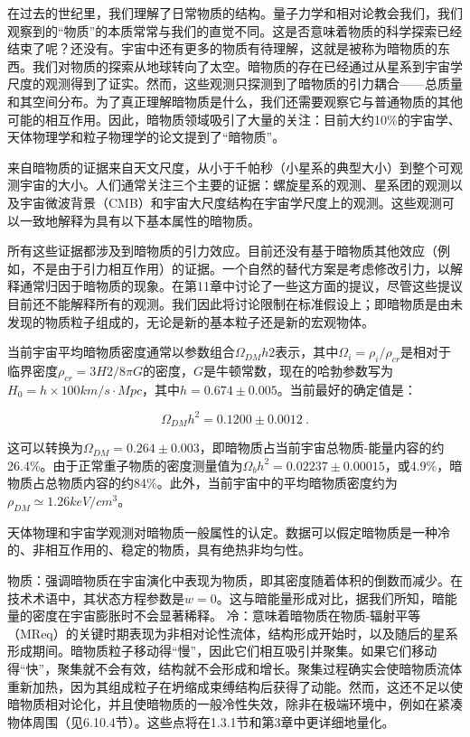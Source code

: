 
在过去的世纪里，我们理解了日常物质的结构。量子力学和相对论教会我们，我们观察到的“物质”的本质常常与我们的直觉不同。这是否意味着物质的科学探索已经结束了呢？还没有。宇宙中还有更多的物质有待理解，这就是被称为暗物质的东西。我们对物质的探索从地球转向了太空。暗物质的存在已经通过从星系到宇宙学尺度的观测得到了证实。然而，这些观测只探测到了暗物质的引力耦合——总质量和其空间分布。为了真正理解暗物质是什么，我们还需要观察它与普通物质的其他可能的相互作用。因此，暗物质领域吸引了大量的关注：目前大约10\%的宇宙学、天体物理学和粒子物理学的论文提到了“暗物质”。

来自暗物质的证据来自天文尺度，从小于千帕秒（小星系的典型大小）到整个可观测宇宙的大小。人们通常关注三个主要的证据：螺旋星系的观测、星系团的观测以及宇宙微波背景（CMB）和宇宙大尺度结构在宇宙学尺度上的观测。这些观测可以一致地解释为具有以下基本属性的暗物质。

所有这些证据都涉及到暗物质的引力效应。目前还没有基于暗物质其他效应（例如，不是由于引力相互作用）的证据。一个自然的替代方案是考虑修改引力，以解释通常归因于暗物质的现象。在第11章中讨论了一些这方面的提议，尽管这些提议目前还不能解释所有的观测。我们因此将讨论限制在标准假设上；即暗物质是由未发现的物质粒子组成的，无论是新的基本粒子还是新的宏观物体。

当前宇宙平均暗物质密度通常以参数组合$\Omega_{DM}h2$表示，其中$\Omega_i = \rho_i/\rho_{cr}$是相对于临界密度$\rho_{cr} = 3H2/8\pi G$的密度，$G$是牛顿常数，现在的哈勃参数写为$H_0 = h \times 100 km/s \cdot Mpc$，其中$h = 0.674 \pm 0.005$。当前最好的确定值是：

\begin{equation}
\Omega_{DM}h^2 = 0.1200 \pm 0.0012~.
\end{equation}

这可以转换为$\Omega_{DM} = 0.264 \pm 0.003$，即暗物质占当前宇宙总物质-能量内容的约26.4\%。由于正常重子物质的密度测量值为$\Omega_b h^2 = 0.02237 \pm 0.00015$，或4.9\%，暗物质占总物质内容的约84\%。此外，当前宇宙中的平均暗物质密度约为$\rho_{DM} \simeq 1.26 keV/ cm^3$。

天体物理和宇宙学观测对暗物质一般属性的认定。数据可以假定暗物质是一种冷的、非相互作用的、稳定的物质，具有绝热非均匀性。

物质：强调暗物质在宇宙演化中表现为物质，即其密度随着体积的倒数而减少。在技术术语中，其状态方程参数是$w = 0$。这与暗能量形成对比，据我们所知，暗能量的密度在宇宙膨胀时不会显著稀释。
冷：意味着暗物质在物质-辐射平等（MReq）的关键时期表现为非相对论性流体，结构形成开始时，以及随后的星系形成期间。暗物质粒子移动得“慢”，因此它们相互吸引并聚集。如果它们移动得“快”，聚集就不会有效，结构就不会形成和增长。聚集过程确实会使暗物质流体重新加热，因为其组成粒子在坍缩成束缚结构后获得了动能。然而，这还不足以使暗物质相对论化，并且使暗物质的一般冷性失效，除非在极端环境中，例如在紧凑物体周围（见6.10.4节）。这些点将在1.3.1节和第3章中更详细地量化。

